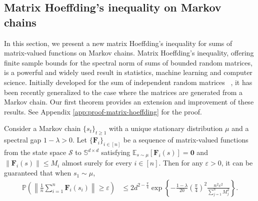 \subsection{Matrix Hoeffding's inequality on Markov chains}
\label{sec:MC-concentration}

In this section, we present a new matrix Hoeffding's inequality for sums of matrix-valued functions on Markov chains. 
Matrix Hoeffding's inequality, offering finite sample bounds for the spectral norm of sums of bounded random matrices, is a powerful and widely used result in statistics, machine learning and computer science.  
Initially developed for the sum of independent random matrices ~\citep[see, e.g.,][]{Tropp2011matrixtails,oliveira.matrix.hoef}, it has been recently generalized \citep{garg2018matrixexpanderchernoff,qiu2020matrix} to the case where the matrices are generated from a Markov chain. 
Our first theorem provides an extension and improvement of these results. See Appendix \ref{app:proof-matrix-hoeffding} for the proof.%
\medskip
\begin{customtheorem}\label{thm:matrix-hoeffding}
Consider a Markov chain $\{s_t\}_{t \geq 1}$ with a unique stationary distribution $\mu$ and a spectral gap $1-\lambda > 0$. Let $\{\bm{F}_i\}_{i \in [n]}$ be a sequence of matrix-valued functions from the state space $\mathcal{S}$ to $\mathbb{S}^{d \times d}$ satisfying $\mathbb{E}_{s \sim \mu}[\bm{F}_i(s)] = \bm{0}$ and $\|\bm{F}_i(s)\| \leq M_i$ almost surely for every $i \in [n]$. 
Then for any $\varepsilon > 0$, it can be guaranteed that when $s_1 \sim \mu$,
\begin{align}\label{eq:markov-matrix-hoeffding}
\mathbb{P}\left(\left\|\frac{1}{n}\sum_{i=1}^n \bm{F}_i(s_i)\right\| \geq \varepsilon \right) &\leq 2d^{2-\frac{\pi}{4}} \exp\left\{-\frac{1-\lambda}{20}\left(\frac{\pi}{4}\right)^2\frac{n^2\varepsilon^2 }{\sum_{j=1}^n M_j^2} \right\}.
\end{align}
\end{customtheorem}
\medskip


